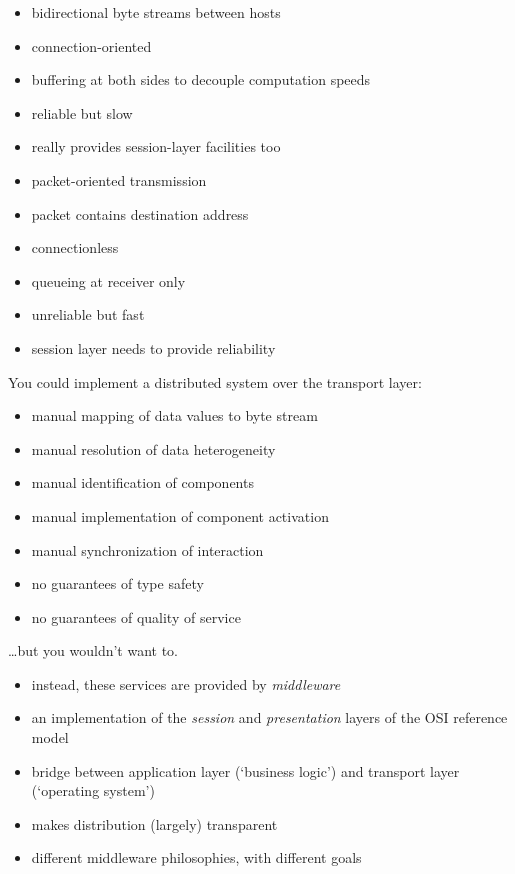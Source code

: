 \documentclass{sepslide-soa-faked} %
\begin{document}
\begin{slide}
  \begin{itemize}
  \item bidirectional byte streams between hosts
  \item connection-oriented
  \item buffering at both sides to decouple computation speeds
  \item reliable but slow
  \item really provides session-layer facilities too
  \end{itemize}
\end{slide}

\begin{slide}
  \begin{itemize}
  \item packet-oriented transmission
  \item packet contains destination address
  \item connectionless
  \item queueing at receiver only
  \item unreliable but fast
  \item session layer needs to provide reliability
  \end{itemize}
\end{slide}

\begin{slide}
  You could implement a distributed system over the transport layer:
  \begin{itemize}
  \item manual mapping of data values to byte stream
  \item manual resolution of data heterogeneity
  \item manual identification of components
  \item manual implementation of component activation
  \item manual synchronization of interaction
  \item no guarantees of type safety
  \item no guarantees of quality of service 
  \end{itemize}
  \ldots but you wouldn't want to.
\end{slide}

\begin{slide}
  \begin{itemize}
  \item instead, these services are provided by \emph{middleware}
  \item an implementation of the \emph{session} and \emph{presentation}
    layers of the OSI reference model
  \item bridge between application layer (`business logic') and transport
    layer (`operating system')
  \item makes distribution (largely) transparent
  \item different middleware philosophies, with different goals
  \end{itemize}
\end{slide}
\end{document}
